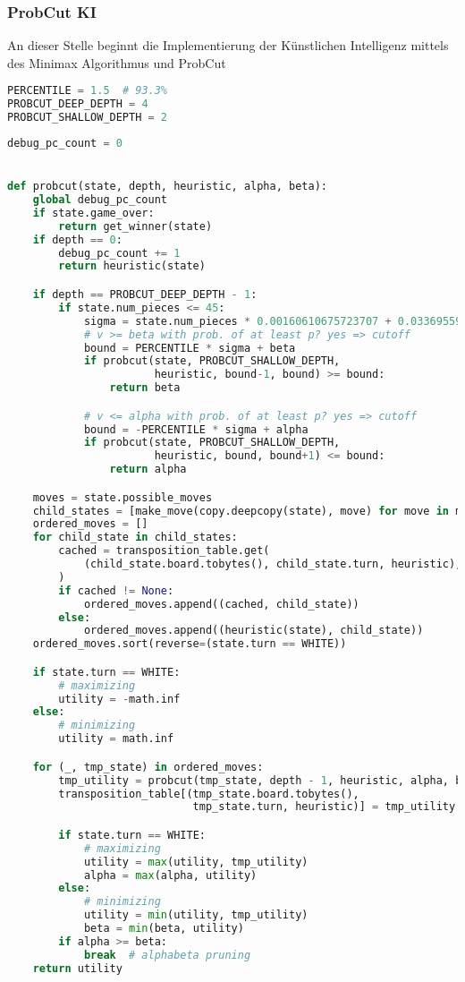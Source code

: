 \hypertarget{probcut-ki}{%
\subsubsection{ProbCut KI}\label{probcut-ki}}

An dieser Stelle beginnt die Implementierung der Künstlichen Intelligenz
mittels des Minimax Algorithmus und ProbCut

\begin{lstlisting}[language=Python]
PERCENTILE = 1.5  # 93.3%
PROBCUT_DEEP_DEPTH = 4
PROBCUT_SHALLOW_DEPTH = 2
\end{lstlisting}

\begin{lstlisting}[language=Python]
debug_pc_count = 0


def probcut(state, depth, heuristic, alpha, beta):
    global debug_pc_count
    if state.game_over:
        return get_winner(state)
    if depth == 0:
        debug_pc_count += 1
        return heuristic(state)

    if depth == PROBCUT_DEEP_DEPTH - 1:
        if state.num_pieces <= 45:
            sigma = state.num_pieces * 0.00160610675723707 + 0.03369559303029926
            # v >= beta with prob. of at least p? yes => cutoff
            bound = PERCENTILE * sigma + beta
            if probcut(state, PROBCUT_SHALLOW_DEPTH,
                       heuristic, bound-1, bound) >= bound:
                return beta

            # v <= alpha with prob. of at least p? yes => cutoff
            bound = -PERCENTILE * sigma + alpha
            if probcut(state, PROBCUT_SHALLOW_DEPTH,
                       heuristic, bound, bound+1) <= bound:
                return alpha

    moves = state.possible_moves
    child_states = [make_move(copy.deepcopy(state), move) for move in moves]
    ordered_moves = []
    for child_state in child_states:
        cached = transposition_table.get(
            (child_state.board.tobytes(), child_state.turn, heuristic), None
        )
        if cached != None:
            ordered_moves.append((cached, child_state))
        else:
            ordered_moves.append((heuristic(state), child_state))
    ordered_moves.sort(reverse=(state.turn == WHITE))

    if state.turn == WHITE:
        # maximizing
        utility = -math.inf
    else:
        # minimizing
        utility = math.inf

    for (_, tmp_state) in ordered_moves:
        tmp_utility = probcut(tmp_state, depth - 1, heuristic, alpha, beta)
        transposition_table[(tmp_state.board.tobytes(),
                             tmp_state.turn, heuristic)] = tmp_utility

        if state.turn == WHITE:
            # maximizing
            utility = max(utility, tmp_utility)
            alpha = max(alpha, utility)
        else:
            # minimizing
            utility = min(utility, tmp_utility)
            beta = min(beta, utility)
        if alpha >= beta:
            break  # alphabeta pruning
    return utility
\end{lstlisting}


